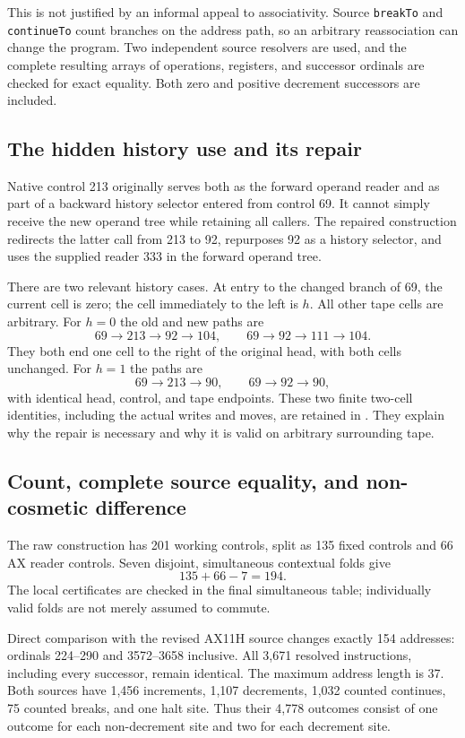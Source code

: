 \documentclass[11pt,a4paper]{article}
\begin{document}
This is not justified by an informal appeal to associativity. Source
\texttt{breakTo} and \texttt{continueTo} count branches on the address
path, so an arbitrary reassociation can change the program. Two independent
source resolvers are used, and the complete resulting arrays of operations,
registers, and successor ordinals are checked for exact equality. Both
zero and positive decrement successors are included.

\subsection{The hidden history use and its repair}
Native control 213 originally serves both as the forward operand reader
and as part of a backward history selector entered from control 69. It
cannot simply receive the new operand tree while retaining all callers.
The repaired construction redirects the latter call from 213 to 92,
repurposes 92 as a history selector, and uses the supplied reader 333 in
the forward operand tree.

There are two relevant history cases. At entry to the changed branch of
69, the current cell is zero; the cell immediately to the left is $h$.
All other tape cells are arbitrary. For $h=0$ the old and new paths are
\[
69\to213\to92\to104,
\qquad
69\to92\to111\to104.
\]
They both end one cell to the right of the original head, with both cells
unchanged. For $h=1$ the paths are
\[
69\to213\to90,
\qquad
69\to92\to90,
\]
with identical head, control, and tape endpoints. These two finite
two-cell identities, including the actual writes and moves, are retained
in . They explain why the repair
is necessary and why it is valid on arbitrary surrounding tape.

\subsection{Count, complete source equality, and non-cosmetic difference}
The raw construction has 201 working controls, split as 135 fixed controls
and 66 AX reader controls. Seven disjoint, simultaneous contextual folds
give
\[
                  135+66-7=194.
\]
The local certificates are checked in the final simultaneous table;
individually valid folds are not merely assumed to commute.

Direct comparison with the revised AX11H source changes exactly 154
addresses: ordinals 224--290 and 3572--3658 inclusive. All 3,671 resolved
instructions, including every successor, remain identical. The maximum
address length is 37. Both sources have 1,456 increments, 1,107 decrements,
1,032 counted continues, 75 counted breaks, and one halt site. Thus their
4,778 outcomes consist of one outcome for each non-decrement site and two
for each decrement site.
\end{document}
